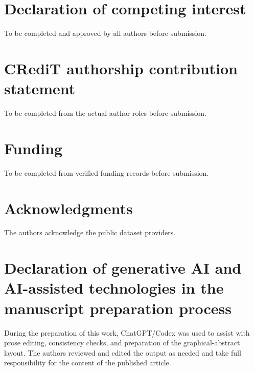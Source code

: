 \documentclass[preprint,12pt]{elsarticle}
\begin{document}
\section*{Declaration of competing interest}
To be completed and approved by all authors before submission.
\section*{CRediT authorship contribution statement}
To be completed from the actual author roles before submission.
\section*{Funding}
To be completed from verified funding records before submission.
\section*{Acknowledgments}
The authors acknowledge the public dataset providers.
\section*{Declaration of generative AI and AI-assisted technologies in the manuscript preparation process}
During the preparation of this work, ChatGPT/Codex was used to assist with prose editing, consistency checks, and preparation of the graphical-abstract layout. The authors reviewed and edited the output as needed and take full responsibility for the content of the published article.
\end{document}
